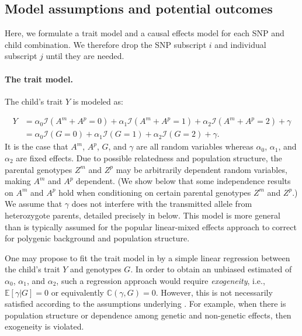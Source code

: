 \documentclass[12pt]{extarticle}
\newcommand{\E}{\mathbb{E}}
\newcommand{\indicator}{\mathcal{I}}
\newcommand{\cV}{\mathbb{C}}
\begin{document}
\subsection{Model assumptions and potential outcomes} \label{sec:gma}

Here, we formulate a trait model and a causal effects model for each SNP and child combination. We therefore drop the SNP subscript $i$ and individual subscript $j$ until they are needed. 

\paragraph{The trait model.} The child's trait $Y$ is modeled as: 

\begin{equation} \label{eq:app_gtm}
\begin{aligned}
Y &= \alpha_0\indicator(A^m+A^p=0) + \alpha_1 \indicator(A^m+A^p=1) + \alpha_2 \indicator(A^m+A^p=2) + \gamma \\
&= \alpha_0\indicator(G=0) + \alpha_1 \indicator(G=1) + \alpha_2 \indicator(G=2) + \gamma.
\end{aligned}
\end{equation}
It is the case that $A^m$, $A^p$, $G$, and $\gamma$ are all random variables whereas $\alpha_0$, $\alpha_1$, and $\alpha_2$ are fixed effects. Due to possible relatedness and population structure, the parental genotypes $Z^m$ and $Z^p$ may be arbitrarily dependent random variables, making $A^m$ and $A^p$ dependent. (We show below that some independence results on $A^m$ and $A^p$ hold when conditioning on certain parental genotypes $Z^m$ and $Z^p$.) We assume that $\gamma$ does not interfere with the transmitted allele from heterozygote parents, detailed precisely in  below. This model is more general than is typically assumed for the popular linear-mixed effects approach to correct for polygenic background and population structure.

One may propose to fit the trait model in  by a simple linear regression between the child's trait $Y$ and genotypes $G$. In order to obtain an unbiased estimated of $\alpha_0$, $\alpha_1$, and $\alpha_2$, such a regression approach would require \textit{exogeneity}, i.e., $\E[\gamma|G]=0$ or equivalently $\cV(\gamma,G)=0$. However, this is not necessarily satisfied according to the assumptions underlying . For example, when there is population structure or dependence among genetic and non-genetic effects, then exogeneity is violated. 
\end{document}
